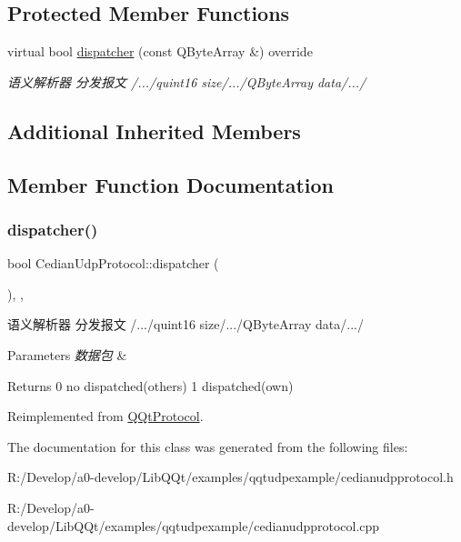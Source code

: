 \subsection*{Protected Member Functions}
\begin{DoxyCompactItemize}
\item 
virtual bool \mbox{\hyperlink{class_cedian_udp_protocol_ad9dfd948a1a10f445d75ccc869b3bc52}{dispatcher}} (const Q\+Byte\+Array \&) override
\begin{DoxyCompactList}\small\item\em 语义解析器 分发报文 /.../quint16 size/.../\+Q\+Byte\+Array data/.../ \end{DoxyCompactList}\end{DoxyCompactItemize}
\subsection*{Additional Inherited Members}


\subsection{Member Function Documentation}
\mbox{\label{class_cedian_udp_protocol_ad9dfd948a1a10f445d75ccc869b3bc52}} 
\subsubsection{\texorpdfstring{dispatcher()}{dispatcher()}}
{\footnotesize\ttfamily bool Cedian\+Udp\+Protocol\+::dispatcher (\begin{DoxyParamCaption}\item[{const Q\+Byte\+Array \&}]{ }\end{DoxyParamCaption})\hspace{0.3cm}{\ttfamily [override]}, {\ttfamily [protected]}, {\ttfamily [virtual]}}



语义解析器 分发报文 /.../quint16 size/.../\+Q\+Byte\+Array data/.../ 


\begin{DoxyParams}{Parameters}
{\em 数据包} & \\
\hline
\end{DoxyParams}
\begin{DoxyReturn}{Returns}
0 no dispatched(others) 1 dispatched(own) 
\end{DoxyReturn}


Reimplemented from \mbox{\hyperlink{class_q_qt_protocol_a35a69c4b89c8cf7459038f40d75e0dc9}{Q\+Qt\+Protocol}}.



The documentation for this class was generated from the following files\+:\begin{DoxyCompactItemize}
\item 
R\+:/\+Develop/a0-\/develop/\+Lib\+Q\+Qt/examples/qqtudpexample/cedianudpprotocol.\+h\item 
R\+:/\+Develop/a0-\/develop/\+Lib\+Q\+Qt/examples/qqtudpexample/cedianudpprotocol.\+cpp\end{DoxyCompactItemize}
